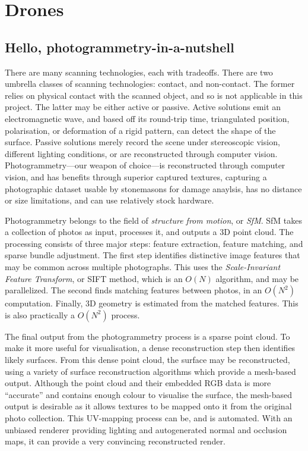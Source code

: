 \section{Drones}
\subsection{Hello, photogrammetry-in-a-nutshell}
There are many scanning technologies, each with tradeoffs. There are two umbrella classes of scanning technologies: contact, and non-contact. The former relies on physical contact with the scanned object, and so is not applicable in this project. The latter may be either active or passive. Active solutions emit an electromagnetic wave, and based off its round-trip time, triangulated position, polarisation, or deformation of a rigid pattern, can detect the shape of the surface. Passive solutions merely record the scene under stereoscopic vision, different lighting conditions, or are reconstructed through computer vision. Photogrammetry---our weapon of choice---is reconstructed through computer vision, and has benefits through superior captured textures, capturing a photographic dataset usable by stonemasons for damage anaylsis, has no distance or size limitations, and can use relatively stock hardware.

Photogrammetry belongs to the field of \emph{structure from motion}, or \emph{SfM}. SfM takes a collection of photos as input, processes it, and outputs a 3D point cloud. The processing consists of three major steps: feature extraction, feature matching, and sparse bundle adjustment.  The first step identifies distinctive image features that may be common across multiple photographs. This uses the \emph{Scale-Invariant Feature Transform}, or SIFT method, which is an $O(N)$ algorithm, and may be parallelized. The second finds matching features between photos, in an $O(N^2)$ computation. Finally, 3D geometry is estimated from the matched features. This is also practically a $O(N^2)$ process. 

The final output from the photogrammetry process is a sparse point cloud. To make it more useful for visualisation, a dense reconstruction step then identifies likely surfaces. From this dense point cloud, the surface may be reconstructed, using a variety of surface reconstruction algorithms which provide a mesh-based output. Although the point cloud and their embedded RGB data is more ``accurate'' and contains enough colour to visualise the surface, the mesh-based output is desirable as it allows textures to be mapped onto it from the original photo collection. This UV-mapping process can be, and is automated. With an unbiased renderer providing lighting and autogenerated normal and occlusion maps, it can provide a very convincing reconstructed render.

